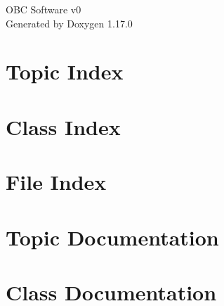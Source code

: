 \documentclass[twoside]{book}
\newcommand{\+}{\discretionary{\mbox{\scriptsize$\hookleftarrow$}}{}{}}
\newcommand{\clearemptydoublepage}{%
    \newpage{\pagestyle{empty}\cleardoublepage}%
  }
\begin{document}
  \raggedbottom
    \hypersetup{pageanchor=false,
                bookmarksnumbered=true,
                pdfencoding=unicode
               }
  \begin{titlepage}
  \vspace*{7cm}
  \begin{center}%
  {\Large OBC Software v0}\\
  \vspace*{1cm}
  {\large Generated by Doxygen 1.17.0}\\
  \end{center}
  \end{titlepage}
  \clearemptydoublepage
  \tableofcontents
  \clearemptydoublepage
  \hypersetup{pageanchor=true}

\chapter{Topic Index}

\chapter{Class Index}

\chapter{File Index}

\chapter{Topic Documentation}





\chapter{Class Documentation}



\end{document}

